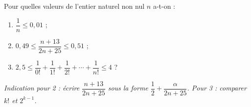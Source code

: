 Pour quelles valeurs de l'entier naturel non nul $n$ a-t-on :
\begin{enumerate}
  \item $\dfrac{1}{n} \leqslant 0{,}01$ ;
  \item $0{,}49 \leqslant \dfrac{n+13}{2n+25} \leqslant 0{,}51$ ;
  \item $2{,}5 \leqslant \dfrac{1}{0!} + \dfrac{1}{1!} + \dfrac{1}{2!} + \cdots + \dfrac{1}{n!} \leqslant 4$ ?
\end{enumerate}
\emph{Indication pour 2 : écrire $\dfrac{n+13}{2n+25}$ sous la forme
$\dfrac12 + \dfrac{\alpha}{2n+25}$. Pour 3 : comparer $k!$ et $2^{k-1}$.}
